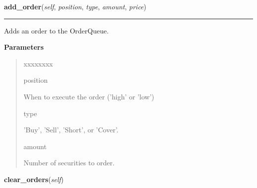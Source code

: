 \hspace{.8\funcindent}\begin{boxedminipage}{\funcwidth}

    \raggedright \textbf{add\_order}(\textit{self}, \textit{position}, \textit{type}, \textit{amount}, \textit{price})

    \vspace{-1.5ex}

    \rule{\textwidth}{0.5\fboxrule}
\setlength{\parskip}{2ex}
    Adds an order to the OrderQueue.

\setlength{\parskip}{1ex}
      \textbf{Parameters}
      \vspace{-1ex}

      \begin{quote}
        \begin{Ventry}{xxxxxxxx}

          \item[position]

          When to execute the order ('high' or 'low')

          \item[type]

          'Buy', 'Sell', 'Short', or 'Cover'.

          \item[amount]

          Number of securities to order.

        \end{Ventry}

      \end{quote}

    \end{boxedminipage}

    \label{nukaquant:OrderQueue:clear_orders}

    \vspace{0.5ex}

\hspace{.8\funcindent}\begin{boxedminipage}{\funcwidth}

    \raggedright \textbf{clear\_orders}(\textit{self})

\setlength{\parskip}{2ex}
\setlength{\parskip}{1ex}
    \end{boxedminipage}

    \label{nukaquant:OrderQueue:get_latest_order}

